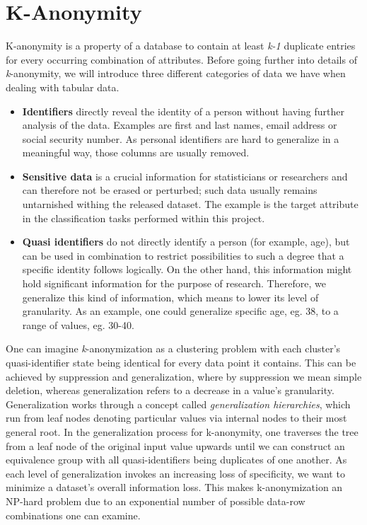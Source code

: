 \documentclass{article}
\begin{document}
\section{K-Anonymity}
K-anonymity is a property of a database to contain at least \textit{k-1} duplicate entries for every occurring combination of attributes. 
Before going further into details of \textit{k}-anonymity, we will introduce three different categories of data we have when dealing with tabular data. 
\begin{itemize}
	\item\textbf{Identifiers} directly reveal the identity of a person without having further analysis of the data. Examples are first and last names, email address or social security number. As personal identifiers are hard to generalize in a meaningful way, those columns are usually removed. 
	\item\textbf{Sensitive data} is a crucial information for statisticians or researchers and can therefore not be erased or perturbed; such data usually remains untarnished withing the released dataset. The example is the target attribute in the classification tasks performed within this project. 
	\item\textbf{Quasi identifiers} do not directly identify a person (for example, age), but can be used in combination to restrict possibilities to such a degree that a specific identity follows logically. On the other hand, this information might hold significant information for the purpose of research. Therefore, we generalize this kind of information, which means to lower its level of granularity. As an example, one could generalize specific age, eg. 38, to a range of values, eg. 30-40. 
\end{itemize}

One can imagine \textit{k}-anonymization as a clustering problem with each cluster's quasi-identifier state being identical for every data point it contains. This can be achieved by suppression and generalization, where by suppression we mean simple deletion, whereas generalization refers to a decrease in a value's granularity. 
Generalization works through a concept called \textit{generalization hierarchies}, which run from leaf nodes denoting particular values via internal nodes to their most general root. In the generalization process for k-anonymity, one traverses the tree from a leaf node of the original input value upwards until we can construct an equivalence group with all quasi-identifiers being duplicates of one another. 
As each level of generalization invokes an increasing loss of specificity, we want to minimize a dataset's overall information loss. This makes k-anonymization an NP-hard problem due to an exponential number of possible data-row combinations one can examine.
\end{document}
